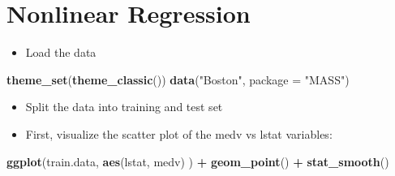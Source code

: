 \documentclass[
]{article}
\newenvironment{Shaded}{\begin{snugshade}}{\end{snugshade}}
\newcommand{\DataTypeTok}[1]{\textcolor[rgb]{0.13,0.29,0.53}{#1}}
\newcommand{\DecValTok}[1]{\textcolor[rgb]{0.00,0.00,0.81}{#1}}
\newcommand{\FloatTok}[1]{\textcolor[rgb]{0.00,0.00,0.81}{#1}}
\newcommand{\KeywordTok}[1]{\textcolor[rgb]{0.13,0.29,0.53}{\textbf{#1}}}
\newcommand{\NormalTok}[1]{#1}
\newcommand{\OperatorTok}[1]{\textcolor[rgb]{0.81,0.36,0.00}{\textbf{#1}}}
\newcommand{\OtherTok}[1]{\textcolor[rgb]{0.56,0.35,0.01}{#1}}
\newcommand{\StringTok}[1]{\textcolor[rgb]{0.31,0.60,0.02}{#1}}
\providecommand{\tightlist}{%
  \setlength{\itemsep}{0pt}\setlength{\parskip}{0pt}}
\begin{document}
\hypertarget{nonlinear-regression}{%
\section{Nonlinear Regression}\label{nonlinear-regression}}

\begin{itemize}
\tightlist
\item
  Load the data
\end{itemize}

\begin{Shaded}
\begin{Highlighting}[]
\KeywordTok{theme_set}\NormalTok{(}\KeywordTok{theme_classic}\NormalTok{())}
\KeywordTok{data}\NormalTok{(}\StringTok{"Boston"}\NormalTok{, }\DataTypeTok{package =} \StringTok{"MASS"}\NormalTok{)}
\end{Highlighting}
\end{Shaded}

\begin{itemize}
\tightlist
\item
  Split the data into training and test set
\end{itemize}

\begin{Shaded}
\end{Shaded}

\begin{itemize}
\tightlist
\item
  First, visualize the scatter plot of the medv vs lstat variables:
\end{itemize}

\begin{Shaded}
\begin{Highlighting}[]
\KeywordTok{ggplot}\NormalTok{(train.data, }\KeywordTok{aes}\NormalTok{(lstat, medv) ) }\OperatorTok{+}
\StringTok{  }\KeywordTok{geom_point}\NormalTok{() }\OperatorTok{+}
\StringTok{  }\KeywordTok{stat_smooth}\NormalTok{()}
\end{Highlighting}
\end{Shaded}
\end{document}
